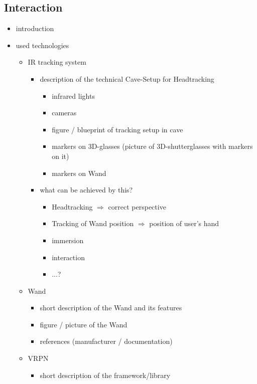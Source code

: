 \documentclass[conference]{acmsiggraph}
\begin{document}

\subsection{Interaction}
\label{SEC:INTERACTION}

\begin{itemize}
\item introduction
\item{ used technologies
	\begin{itemize}
	\item{IR tracking system
		\begin{itemize}
		\item{description of the technical Cave-Setup for Headtracking
			\begin{itemize}
			\item infrared lights
			\item cameras
			\item figure / blueprint of tracking setup in cave
			\item markers on 3D-glasses (picture of 3D-shutterglasses with markers on it)
			\item markers on Wand
			\end{itemize}
		}
		\item{what can be achieved by this?
			\begin{itemize}
				\item Headtracking $\Rightarrow$ correct perspective
				\item Tracking of Wand position $\Rightarrow$ position of user's hand
				\item immersion
				\item interaction
				\item ...?
			\end{itemize}		
		}
		\end{itemize}
	}
	\item{Wand
		\begin{itemize}
		\item short description of the Wand and its features
		\item figure / picture of the Wand
		\item references (manufacturer / documentation)
		\end{itemize}
	}
	\item{VRPN
		\begin{itemize}
		\item short description of the framework/library

\end{itemize}}
\end{itemize}}
\end{itemize}
\end{document}
